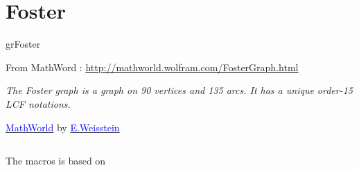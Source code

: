\newpage\section{Foster}\label{foster}

\begin{NewMacroBox}{grFoster}{}

\medskip
From MathWord : \url{http://mathworld.wolfram.com/FosterGraph.html}

\emph{The Foster graph is a graph on 90 vertices and 135 arcs.  It has a unique order-15 LCF notations.}

\href{http://mathworld.wolfram.com/topics/GraphTheory.html}%
           {\textcolor{blue}{MathWorld}} by \href{http://en.wikipedia.org/wiki/Eric_W._Weisstein}%
           {\textcolor{blue}{E.Weisstein}} 
 \end{NewMacroBox}

\subsection{}

The macros is based on 

\begin{tkzexample}
\end{tkzexample}

\vspace*{1cm}
\begin{center}
\begin{tkzexample}[vbox]
\end{tkzexample} 
\end{center}

\endinput
